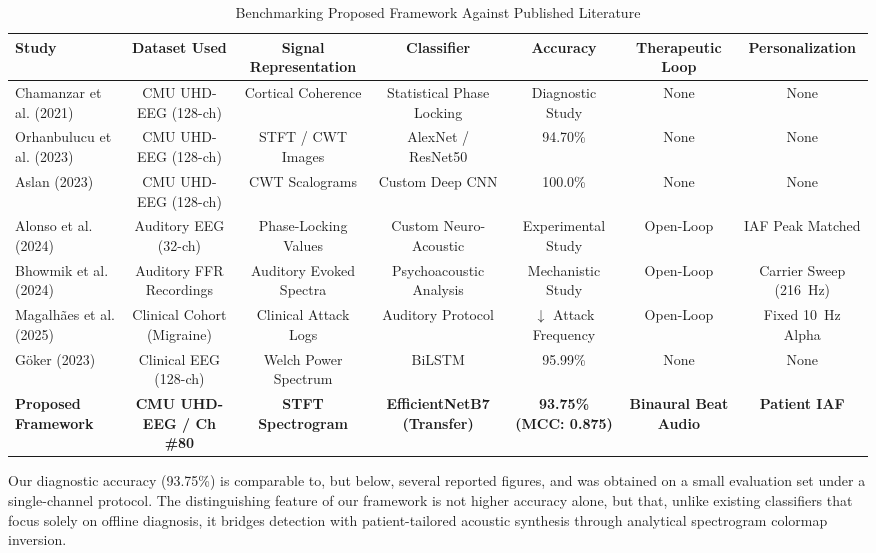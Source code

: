 \documentclass[12pt, a4paper]{report}
\begin{document}
\begin{table}[htbp]
\centering
\caption{Benchmarking Proposed Framework Against Published Literature}
\label{tab:literature_benchmarks}
\begin{adjustbox}{width=0.98\textwidth}
\begin{tabular}{lcccccc}
\toprule
\textbf{Study} & \textbf{Dataset Used} & \textbf{Signal Representation} & \textbf{Classifier} & \textbf{Accuracy} & \textbf{Therapeutic Loop} & \textbf{Personalization} \\
\midrule
Chamanzar et al. (2021) \cite{chamanzar2021uhd} & CMU UHD-EEG (128-ch) & Cortical Coherence & Statistical Phase Locking & Diagnostic Study & None & None \\
Orhanbulucu et al. (2023) \cite{orhanbulucu2023hybrid} & CMU UHD-EEG (128-ch) & STFT / CWT Images & AlexNet / ResNet50 & 94.70\% & None & None \\
Aslan (2023) \cite{aslan2023migrainecnn} & CMU UHD-EEG (128-ch) & CWT Scalograms & Custom Deep CNN & 100.0\% & None & None \\
Alonso et al. (2024) \cite{alonso2024individualized} & Auditory EEG (32-ch) & Phase-Locking Values & Custom Neuro-Acoustic & Experimental Study & Open-Loop & IAF Peak Matched \\
Bhowmik et al. (2024) \cite{bhowmik2024carrier} & Auditory FFR Recordings & Auditory Evoked Spectra & Psychoacoustic Analysis & Mechanistic Study & Open-Loop & Carrier Sweep (216~Hz) \\
Magalh\~aes et al. (2025) \cite{magalhaes2025auditory} & Clinical Cohort (Migraine) & Clinical Attack Logs & Auditory Protocol & $\downarrow$ Attack Frequency & Open-Loop & Fixed 10~Hz Alpha \\
G\"oker (2023) \cite{Goker2023} & Clinical EEG (128-ch) & Welch Power Spectrum & BiLSTM & 95.99\% & None & None \\
\textbf{Proposed Framework} & \textbf{CMU UHD-EEG / Ch \#80} & \textbf{STFT Spectrogram} & \textbf{EfficientNetB7 (Transfer)} & \textbf{93.75\% (MCC: 0.875)} & \textbf{Binaural Beat Audio} & \textbf{Patient IAF} \\
\bottomrule
\end{tabular}
\end{adjustbox}
\end{table}

Our diagnostic accuracy (93.75\%) is comparable to, but below, several reported figures, and was obtained on a small evaluation set under a single-channel protocol. The distinguishing feature of our framework is not higher accuracy alone, but that, unlike existing classifiers that focus solely on offline diagnosis, it bridges detection with patient-tailored acoustic synthesis through analytical spectrogram colormap inversion.
\end{document}
